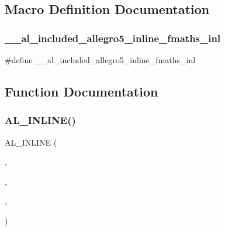 \subsection{Macro Definition Documentation}
\mbox{\label{fmaths_8inl_a68082877191ea8b13e84fc7c1bac9c7d}} 
\subsubsection{\texorpdfstring{\+\_\+\+\_\+al\+\_\+included\+\_\+allegro5\+\_\+inline\+\_\+fmaths\+\_\+inl}{\_\_al\_included\_allegro5\_inline\_fmaths\_inl}}
{\footnotesize\ttfamily \#define \+\_\+\+\_\+al\+\_\+included\+\_\+allegro5\+\_\+inline\+\_\+fmaths\+\_\+inl}



\subsection{Function Documentation}
\mbox{\label{fmaths_8inl_a212fd5cd1111c68a88623f17e1e4d2b9}} 
\subsubsection{\texorpdfstring{A\+L\+\_\+\+I\+N\+L\+I\+N\+E()}{AL\_INLINE()}\hspace{0.1cm}{\footnotesize\ttfamily [1/7]}}
{\footnotesize\ttfamily A\+L\+\_\+\+I\+N\+L\+I\+NE (\begin{DoxyParamCaption}\item[{\hyperlink{fixed_8h_acaad2e927f969d9882d1e1e80ac1c5e2}{al\+\_\+fixed}}]{,  }\item[{al\+\_\+ftofix}]{,  }\item[{(double \hyperlink{fmaths_8inl_a7ba8ab2f1e8f362163e17da3f15a5db9}{x})}]{,  }\item[{\{ \hyperlink{fmaths_8inl_a8ad2d7d1a24282db868a211942368bd1}{if}(\hyperlink{fmaths_8inl_a7ba8ab2f1e8f362163e17da3f15a5db9}{x} $>$ 32767.\+0) \{ al\+\_\+set\+\_\+errno(E\+R\+A\+N\+GE);return 0x7\+F\+F\+F\+F\+F\+F\+F;\} if(x$<$ -\/32767.\+0) \{ al\+\_\+set\+\_\+errno(\+E\+R\+A\+N\+G\+E);return -\/0x7\+F\+F\+F\+F\+F\+F\+F;\} return(al\+\_\+fixed)(x $\ast$65536.\+0+(x$<$ 0 ? -\/0.\+5 \+:0.\+5));\}}]{ }\end{DoxyParamCaption})}

